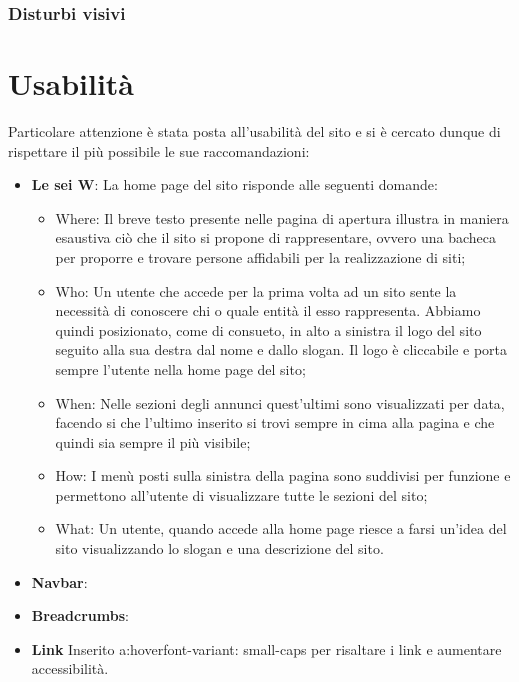 \documentclass[12pt]{article}
\begin{document}
		\subsubsection{Disturbi visivi}
		
\section{Usabilità}
Particolare attenzione è stata posta all’usabilità del sito e si è cercato dunque di rispettare il più possibile le sue raccomandazioni:

\begin{itemize}
\item \textbf{Le sei W}: La home page del sito risponde alle seguenti domande:

\begin{itemize}
\item Where: Il breve testo presente nelle pagina di apertura illustra in maniera esaustiva ciò che il sito si propone di rappresentare, ovvero una bacheca per proporre e trovare persone affidabili per la realizzazione di siti;
\item Who: Un utente che accede per la prima volta ad un sito sente la necessità di conoscere chi o quale entità il esso rappresenta. Abbiamo quindi posizionato, come di consueto, in alto a sinistra il logo del sito seguito alla sua destra dal nome e dallo slogan. Il logo è cliccabile e porta sempre l'utente nella home page del sito;
\item When: Nelle sezioni degli annunci quest'ultimi sono visualizzati per data, facendo si che l'ultimo inserito si trovi sempre in cima alla pagina e che quindi sia sempre il più visibile;
\item How: I menù posti sulla sinistra della pagina sono suddivisi per funzione e permettono all'utente di visualizzare tutte le sezioni del sito;
\item What: Un utente, quando accede alla home page riesce a farsi un’idea del sito visualizzando lo slogan e una descrizione del sito.
\end{itemize}

\item \textbf{Navbar}:

\item \textbf{Breadcrumbs}:

\item \textbf{Link}
Inserito a:hover{font-variant: small-caps} per risaltare i link e aumentare accessibilità.


\end{itemize}
\end{document}
